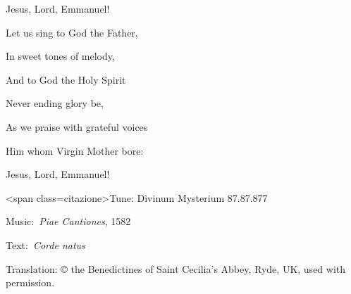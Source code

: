 \begin{hymnsource}
Jesus, Lord, Emmanuel!



Let us sing to God the Father,

In sweet tones of melody,

And to God the Holy Spirit

Never ending glory be,

As we praise with grateful voices

Him whom Virgin Mother bore:

Jesus, Lord, Emmanuel!



<span class=citazione>Tune: Divinum Mysterium 87.87.877

Music: \emph{Piae Cantiones}, 1582

Text: \emph{Corde natus}

Translation: © the Benedictines of Saint Cecilia’s Abbey, Ryde, UK, used with permission.

\end{hymnsource}